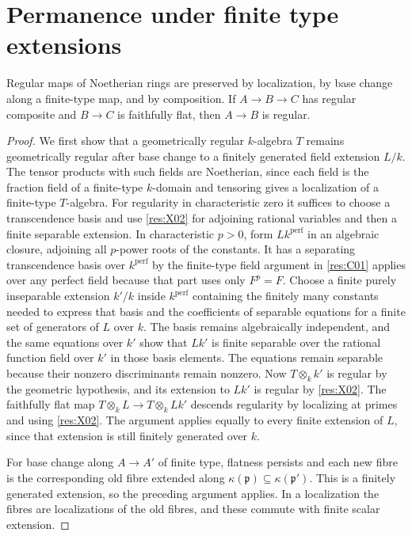 \section[Finite-type permanence]{Permanence under finite type extensions}

\begin{lemma}\label{res:X11}
Regular maps of Noetherian rings are preserved by localization, by base change along a finite-type map, and by composition. If \(A\to B\to C\) has regular composite and \(B\to C\) is faithfully flat, then \(A\to B\) is regular.
\end{lemma}
\begin{proof}
We first show that a geometrically regular \(k\)-algebra \(T\) remains geometrically regular after base change to a finitely generated field extension \(L/k\). The tensor products with such fields are Noetherian, since each field is the fraction field of a finite-type \(k\)-domain and tensoring gives a localization of a finite-type \(T\)-algebra. For regularity in characteristic zero it suffices to choose a transcendence basis and use \ref{res:X02} for adjoining rational variables and then a finite separable extension. In characteristic \(p>0\), form \(Lk^{\mathrm{perf}}\) in an algebraic closure, adjoining all \(p\)-power roots of the constants. It has a separating transcendence basis over \(k^{\mathrm{perf}}\) by the finite-type field argument in \ref{res:C01} applies over any perfect field because that part uses only \(F^p=F\). Choose a finite purely inseparable extension \(k'/k\) inside \(k^{\mathrm{perf}}\) containing the finitely many constants needed to express that basis and the coefficients of separable equations for a finite set of generators of \(L\) over \(k\). The basis remains algebraically independent, and the same equations over \(k'\) show that \(Lk'\) is finite separable over the rational function field over \(k'\) in those basis elements. The equations remain separable because their nonzero discriminants remain nonzero. Now \(T\otimes_k k'\) is regular by the geometric hypothesis, and its extension to \(Lk'\) is regular by \ref{res:X02}. The faithfully flat map \(T\otimes_k L\to T\otimes_k Lk'\) descends regularity by localizing at primes and using \ref{res:X02}. The argument applies equally to every finite extension of \(L\), since that extension is still finitely generated over \(k\).

For base change along \(A\to A'\) of finite type, flatness persists and each new fibre is the corresponding old fibre extended along \(\kappa(\mathfrak p)\subseteq\kappa(\mathfrak p')\). This is a finitely generated extension, so the preceding argument applies. In a localization the fibres are localizations of the old fibres, and these commute with finite scalar extension.


\end{proof}
